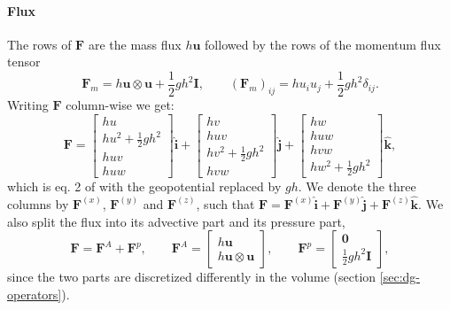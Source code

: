 \paragraph{Flux}
The rows of $\mathbf{F}$ are the mass flux $h\mathbf{u}$ followed by the rows of the momentum flux tensor
\begin{equation*}
    \mathbf{F}_m = h\mathbf{u}\otimes\mathbf{u} + \frac12 gh^2\mathbf{I}, \qquad
    (\mathbf{F}_m)_{ij} = h u_i u_j + \frac12 gh^2\delta_{ij}.
\end{equation*}
Writing $\mathbf{F}$ column-wise we get:
\begin{equation*}
    \mathbf{F} =
    \begin{bmatrix}
    hu\\
    hu^2 + \frac12 gh^2\\
    huv\\
    huw
    \end{bmatrix}\hat{\mathbf{i}} +
    \begin{bmatrix}
    hv\\
    huv\\
    hv^2 + \frac12 gh^2\\
    hvw
    \end{bmatrix}\hat{\mathbf{j}} +
    \begin{bmatrix}
    hw\\
    huw\\
    hvw\\
    hw^2 + \frac12 gh^2
    \end{bmatrix}\hat{\mathbf{k}},
\end{equation*}
which is eq. 2 of \cite{GIRALDO2002499} with the geopotential replaced by $gh$. We denote the three columns by $\mathbf{F}^{(x)}$, $\mathbf{F}^{(y)}$ and $\mathbf{F}^{(z)}$, such that $\mathbf{F} = \mathbf{F}^{(x)}\hat{\mathbf{i}} + \mathbf{F}^{(y)}\hat{\mathbf{j}} + \mathbf{F}^{(z)}\hat{\mathbf{k}}$. We also split the flux into its advective part and its pressure part,
\begin{equation}\label{eq:dg-fluxsplit}
    \mathbf{F} = \mathbf{F}^A + \mathbf{F}^p, \qquad
    \mathbf{F}^A =
    \begin{bmatrix}
    h\mathbf{u}\\
    h\mathbf{u}\otimes\mathbf{u}
    \end{bmatrix}, \qquad
    \mathbf{F}^p =
    \begin{bmatrix}
    \mathbf{0}\\
    \frac12gh^2\mathbf{I}
    \end{bmatrix},
\end{equation}
since the two parts are discretized differently in the volume (section \ref{sec:dg-operators}).

